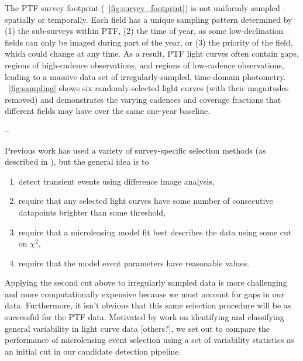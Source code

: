 \documentclass[12pt,preprint]{aastex}
\begin{document}
The PTF survey footprint (\figurename~\ref{fig:survey_footprint}) is not uniformly sampled -- spatially or temporally. Each field has a unique sampling pattern determined by (1) the sub-surveys within PTF, (2) the time of year, as some low-declination fields can only be imaged during part of the year, or (3) the priority of the field, which could  change at any time. As a result, PTF light curves often contain gaps, regions of high-cadence observations, and regions of low-cadence observations, leading to a massive data set of irregularly-sampled, time-domain photometry. \figurename~\ref{fig:sampling} shows six randomly-selected light curves (with their magnitudes removed) and demonstrates the varying cadences and coverage fractions that different fields may have over the same one-year baseline.

--

Previous work has used a variety of survey-specific selection methods (as described in \citealt{alcock2000, wyrzykowski2009, hamadache2009, sumi2011}), but the general idea is to \begin{enumerate}
	\item detect transient events using difference image analysis, 
	\item require that any selected light curves have some number of consecutive datapoints brighter than some threshold,
	\item require that a microlensing model fit best describes the data using some cut on $\chi^2$,
	\item require that the model event parameters have reasonable values.
\end{enumerate}
Applying the second cut above to irregularly sampled data is more challenging and more computationally expensive because we must account for gaps in our data. Furthermore, it isn't obvious that this same selection procedure will be as successful for the PTF data. Motivated by work on identifying and classifying general variability in light curve data \citep{shin2009}[others?], we set out to compare the performance of microlensing event selection using a set of variability statistics as an initial cut in our candidate detection pipeline.
\end{document}
